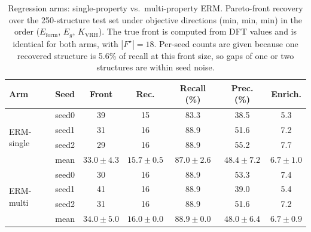 \begin{table}[htbp]
\renewcommand{\arraystretch}{1.2}
\setlength{\tabcolsep}{4pt}
\caption{Regression arms: single-property vs.\ multi-property ERM. Pareto-front recovery over the 250-structure test set under objective directions (min, min, min) in the order ($E_\mathrm{form}$, $E_g$, $K_\mathrm{VRH}$). The true front is computed from DFT values and is identical for both arms, with $|F^\star|{=}18$. Per-seed counts are given because one recovered structure is 5.6\% of recall at this front size, so gaps of one or two structures are within seed noise.}
\label{tab:pareto_arms_erm}
\centering
\footnotesize
\begin{tabular}{@{}llccccc@{}}
\hline\hline
\textbf{Arm} & \textbf{Seed} & \textbf{Front} & \textbf{Rec.} & \textbf{Recall (\%)} & \textbf{Prec. (\%)} & \textbf{Enrich.} \\
\hline
\multirow{4}{*}{ERM-single}
  & seed0 & 39 & 15 & 83.3 & 38.5 & 5.3 \\
  & seed1 & 31 & 16 & 88.9 & 51.6 & 7.2 \\
  & seed2 & 29 & 16 & 88.9 & 55.2 & 7.7 \\
  & mean & $33.0 \pm 4.3$ & $15.7 \pm 0.5$ & $87.0 \pm 2.6$ & $48.4 \pm 7.2$ & $6.7 \pm 1.0$ \\
\hline
\multirow{4}{*}{ERM-multi}
  & seed0 & 30 & 16 & 88.9 & 53.3 & 7.4 \\
  & seed1 & 41 & 16 & 88.9 & 39.0 & 5.4 \\
  & seed2 & 31 & 16 & 88.9 & 51.6 & 7.2 \\
  & mean & $34.0 \pm 5.0$ & $16.0 \pm 0.0$ & $88.9 \pm 0.0$ & $48.0 \pm 6.4$ & $6.7 \pm 0.9$ \\
\hline\hline
\end{tabular}
\end{table}
